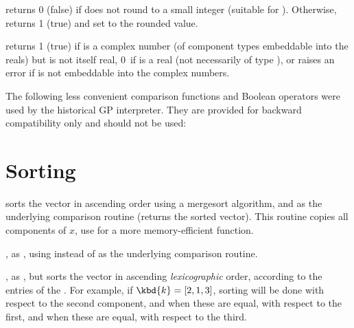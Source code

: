  returns 0 (false) if  does not
round to a small integer (suitable for ). Otherwise, returns 1
(true) and set  to the rounded value.

 returns 1 (true) if  is a complex number
(of component types embeddable into the reals) but is not itself real, 0~if
 is a real (not necessarily of type ), or raises an error if
 is not embeddable into the complex numbers.


The following less convenient comparison functions and Boolean operators were
used by the historical GP interpreter. They are provided for backward
compatibility only and should not be used:










\section{Sorting}


 sorts the vector  in ascending order using a
mergesort algorithm, and  as the underlying comparison routine
(returns the sorted vector). This routine copies all components of $x$, use
 for a more memory-efficient function.

, as , using  instead of
 as the underlying comparison routine.

, as , but sorts the
vector  in ascending \emph{lexicographic} order, according to the
entries of the  . For example,  if $\kbd{k} = [2,1,3]$,
sorting will be done with respect to the second component,  and when these
are  equal, with respect to the first,  and when these are equal,  with
respect to the third.

